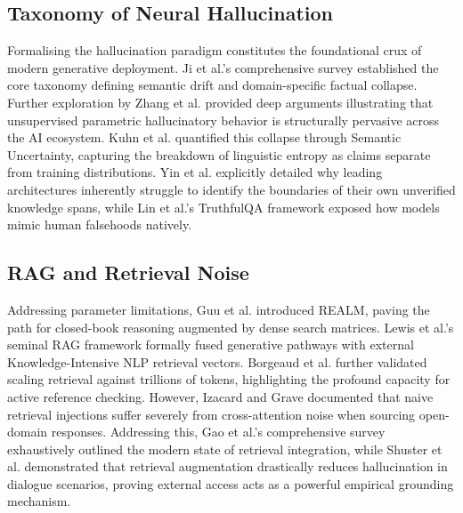 \documentclass[11pt,a4paper]{article}
\begin{document}
\subsection{Taxonomy of Neural Hallucination}
Formalising the hallucination paradigm constitutes the foundational crux of modern generative deployment. Ji et al.'s comprehensive survey \cite{ref1} established the core taxonomy defining semantic drift and domain-specific factual collapse. Further exploration by Zhang et al. \cite{ref16} provided deep arguments illustrating that unsupervised parametric hallucinatory behavior is structurally pervasive across the AI ecosystem. Kuhn et al. \cite{ref2} quantified this collapse through Semantic Uncertainty, capturing the breakdown of linguistic entropy as claims separate from training distributions. Yin et al. \cite{ref23} explicitly detailed why leading architectures inherently struggle to identify the boundaries of their own unverified knowledge spans, while Lin et al.'s TruthfulQA framework \cite{ref12} exposed how models mimic human falsehoods natively.

\subsection{RAG and Retrieval Noise}
Addressing parameter limitations, Guu et al. \cite{ref4} introduced REALM, paving the path for closed-book reasoning augmented by dense search matrices. Lewis et al.'s seminal RAG framework \cite{ref3} formally fused generative pathways with external Knowledge-Intensive NLP retrieval vectors. Borgeaud et al. \cite{ref5} further validated scaling retrieval against trillions of tokens, highlighting the profound capacity for active reference checking. However, Izacard and Grave \cite{ref6} documented that naive retrieval injections suffer severely from cross-attention noise when sourcing open-domain responses. Addressing this, Gao et al.'s comprehensive survey \cite{ref7} exhaustively outlined the modern state of retrieval integration, while Shuster et al. \cite{ref8} demonstrated that retrieval augmentation drastically reduces hallucination in dialogue scenarios, proving external access acts as a powerful empirical grounding mechanism.
\end{document}
